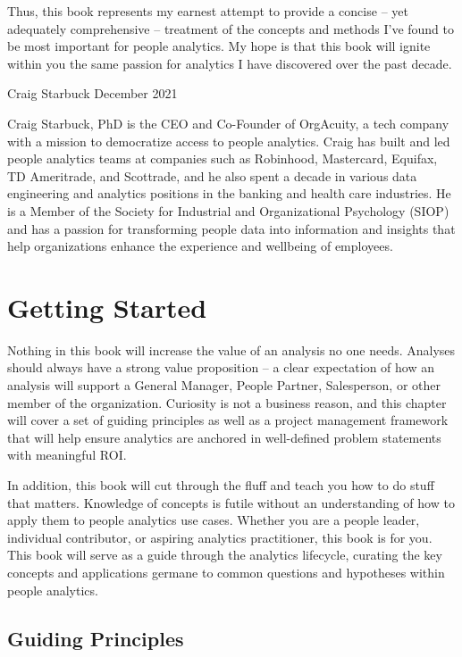 \documentclass[]{book}
\begin{document}
Thus, this book represents my earnest attempt to provide a concise -- yet adequately comprehensive -- treatment of the concepts and methods I've found to be most important for people analytics. My hope is that this book will ignite within you the same passion for analytics I have discovered over the past decade.

Craig Starbuck
December 2021

Craig Starbuck, PhD is the CEO and Co-Founder of OrgAcuity, a tech company with a mission to democratize access to people analytics. Craig has built and led people analytics teams at companies such as Robinhood, Mastercard, Equifax, TD Ameritrade, and Scottrade, and he also spent a decade in various data engineering and analytics positions in the banking and health care industries. He is a Member of the Society for Industrial and Organizational Psychology (SIOP) and has a passion for transforming people data into information and insights that help organizations enhance the experience and wellbeing of employees.

\hypertarget{getting-started}{%
\chapter{Getting Started}\label{getting-started}}

Nothing in this book will increase the value of an analysis no one needs. Analyses should always have a strong value proposition -- a clear expectation of how an analysis will support a General Manager, People Partner, Salesperson, or other member of the organization. Curiosity is not a business reason, and this chapter will cover a set of guiding principles as well as a project management framework that will help ensure analytics are anchored in well-defined problem statements with meaningful ROI.

In addition, this book will cut through the fluff and teach you how to do stuff that matters. Knowledge of concepts is futile without an understanding of how to apply them to people analytics use cases. Whether you are a people leader, individual contributor, or aspiring analytics practitioner, this book is for you. This book will serve as a guide through the analytics lifecycle, curating the key concepts and applications germane to common questions and hypotheses within people analytics.

\hypertarget{guiding-principles}{%
\section{Guiding Principles}\label{guiding-principles}}
\end{document}
